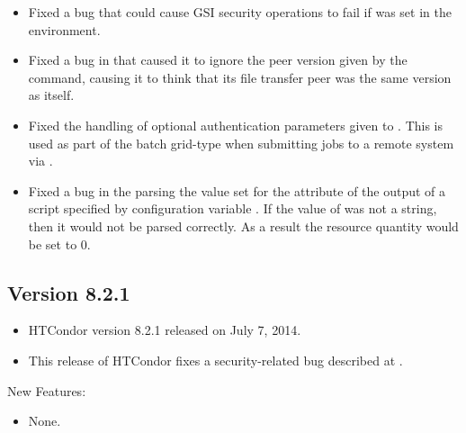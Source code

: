 \begin{itemize}
\item Fixed a bug that could cause GSI security operations to fail if
 was set in the environment.

\item Fixed a bug in  that caused it to ignore the peer
version given by the  command, causing it to think that
its file transfer peer was the same version as itself.

\item Fixed the handling of optional authentication parameters given to
. This is used as part of the batch grid-type when
submitting jobs to a remote system via .

\item  Fixed a bug in the parsing the value set for the
 attribute of the output of a script specified by
configuration variable .
If the value of  was not a string, 
then it would not be parsed correctly. 
As a result the resource quantity would be set to 0.

\end{itemize}

\subsection*{\label{sec:New-8-2-1}Version 8.2.1}

\begin{itemize}
\item HTCondor version 8.2.1 released on July 7, 2014.

\item \Security
This release of HTCondor fixes a security-related bug described at 
.

\end{itemize}

\noindent New Features:

\begin{itemize}

\item None.

\end{itemize}

